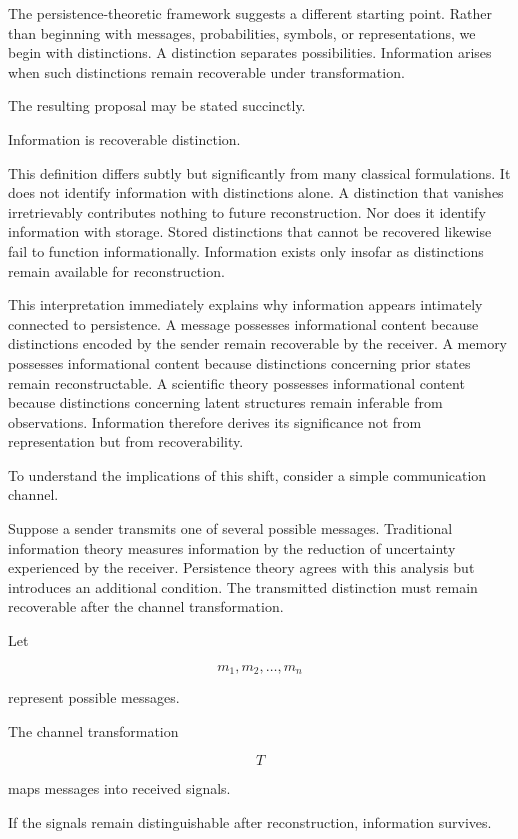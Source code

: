 \documentclass[12pt,oneside]{article}
\theoremstyle{definition}
\begin{document}
The persistence-theoretic framework suggests a different starting point. Rather than beginning with messages, probabilities, symbols, or representations, we begin with distinctions. A distinction separates possibilities. Information arises when such distinctions remain recoverable under transformation.

The resulting proposal may be stated succinctly.

Information is recoverable distinction.

This definition differs subtly but significantly from many classical formulations. It does not identify information with distinctions alone. A distinction that vanishes irretrievably contributes nothing to future reconstruction. Nor does it identify information with storage. Stored distinctions that cannot be recovered likewise fail to function informationally. Information exists only insofar as distinctions remain available for reconstruction.

This interpretation immediately explains why information appears intimately connected to persistence. A message possesses informational content because distinctions encoded by the sender remain recoverable by the receiver. A memory possesses informational content because distinctions concerning prior states remain reconstructable. A scientific theory possesses informational content because distinctions concerning latent structures remain inferable from observations. Information therefore derives its significance not from representation but from recoverability.

To understand the implications of this shift, consider a simple communication channel.

Suppose a sender transmits one of several possible messages. Traditional information theory measures information by the reduction of uncertainty experienced by the receiver. Persistence theory agrees with this analysis but introduces an additional condition. The transmitted distinction must remain recoverable after the channel transformation.

Let

\[
m_1,m_2,\ldots,m_n
\]

represent possible messages.

The channel transformation

\[
T
\]

maps messages into received signals.

If the signals remain distinguishable after reconstruction, information survives.
\end{document}
